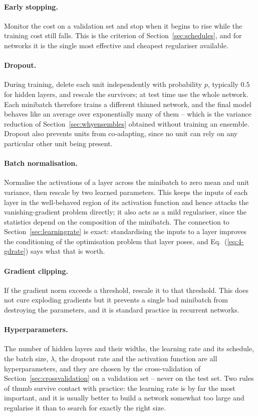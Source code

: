 \paragraph{Early stopping.}
Monitor the cost on a validation set and stop when it begins to rise while the
training cost still falls.  This is the criterion of
Section~\ref{sec:schedules}, and for networks it is the single most effective
and cheapest regulariser available.

\paragraph{Dropout.}
During training, delete each unit independently with probability $p$, typically
$0.5$ for hidden layers, and rescale the survivors; at test time use the whole
network.  Each minibatch therefore trains a different thinned network, and the
final model behaves like an average over exponentially many of them -- which is
the variance reduction of Section~\ref{sec:whyensembles} obtained without
training an ensemble.  Dropout also prevents units from co-adapting, since no
unit can rely on any particular other unit being present.

\paragraph{Batch normalisation.}
Normalise the activations of a layer across the minibatch to zero mean and unit
variance, then rescale by two learned parameters.  This keeps the inputs of
each layer in the well-behaved region of its activation function and hence
attacks the vanishing-gradient problem directly; it also acts as a mild
regulariser, since the statistics depend on the composition of the minibatch.
The connection to Section~\ref{sec:learningrate} is exact: standardising the
inputs to a layer improves the conditioning of the optimisation problem that
layer poses, and Eq.~(\ref{eq:4-gdrate}) says what that is worth.

\paragraph{Gradient clipping.}
If the gradient norm exceeds a threshold, rescale it to that threshold.  This
does not cure exploding gradients but it prevents a single bad minibatch from
destroying the parameters, and it is standard practice in recurrent networks.

\paragraph{Hyperparameters.}
The number of hidden layers and their widths, the learning rate and its
schedule, the batch size, $\lambda$, the dropout rate and the activation
function are all hyperparameters, and they are chosen by the cross-validation
of Section~\ref{sec:crossvalidation} on a validation set -- never on the test
set.  Two rules of thumb survive contact with practice: the learning rate is by
far the most important, and it is usually better to build a network somewhat
too large and regularise it than to search for exactly the right size.


